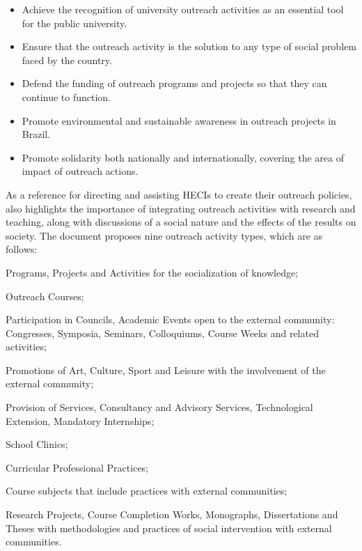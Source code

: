 \begin{itemize}
  \item Achieve the recognition of university outreach activities as an essential tool for the public university.
  \item Ensure that the outreach activity is the solution to any type of social problem faced by the country.
  \item Defend the funding of outreach programs and projects so that they can continue to function.
  \item Promote environmental and sustainable awareness in outreach projects in Brazil.
  \item Promote solidarity both nationally and internationally, covering the area of impact of outreach actions.
\end{itemize}

As a reference for directing and assisting \acp{HECI} to create their outreach policies, \cite{referenciaisPolitica} also highlights the importance of integrating outreach activities with research and teaching, along with discussions of a social nature and the effects of the results on society. The document proposes nine outreach activity types, which are as follows:

\begin{inparaenum}[(1)]
  \item Programs, Projects and Activities for the socialization of knowledge;
  \item Outreach Courses;
  \item Participation in Councils, Academic Events open to the external community: Congresses, Symposia, Seminars, Colloquiums, Course Weeks and related activities;
  \item Promotions of Art, Culture, Sport and Leisure with the involvement of the external community;
  \item Provision of Services, Consultancy and Advisory Services, Technological Extension, Mandatory Internships;
  \item School Clinics;
  \item Curricular Professional Practices;
  \item Course subjects that include practices with external communities;
  \item Research Projects, Course Completion Works,
  Monographs, Dissertations and Theses with methodologies and practices of social intervention with external communities.
\end{inparaenum}

